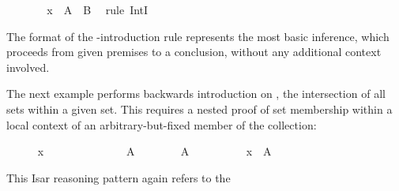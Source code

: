 \begin{isabellebody}
\ \ \ \ \isamarkupfalse%
\ \isamarkupfalse%
\ {\isachardoublequoteopen}x\ {\isasymin}\ A\ {\isasyminter}\ B{\isachardoublequoteclose}\ \isamarkupfalse%
\ {\isacharparenleft}rule\ IntI{\isacharparenright}%
\endisatagproof
{\isafoldproof}%
%
\isadelimproof
%
\endisadelimproof
%
\begin{isamarkuptext}%
\noindent The format of the \isa{{\isachardoublequote}{\isasyminter}{\isachardoublequote}}-introduction rule represents
  the most basic inference, which proceeds from given premises to a
  conclusion, without any additional context involved.

  \medskip The next example performs backwards introduction on \isa{{\isachardoublequote}{\isasymInter}{\isasymA}{\isachardoublequote}}, the intersection of all sets within a given set.  This
  requires a nested proof of set membership within a local context of
  an arbitrary-but-fixed member of the collection:%
\end{isamarkuptext}%
\isamarkuptrue%
%
\medskip\begin{minipage}{0.6\textwidth}
%
\isadelimproof
%
\endisadelimproof
%
\isatagproof
\ \ \ \ \isamarkupfalse%
\ {\isachardoublequoteopen}x\ {\isasymin}\ {\isasymInter}{\isasymA}{\isachardoublequoteclose}\isanewline
\ \ \ \ \isamarkupfalse%
\isanewline
\ \ \ \ \ \ \isamarkupfalse%
\ A\isanewline
\ \ \ \ \ \ \isamarkupfalse%
\ {\isachardoublequoteopen}A\ {\isasymin}\ {\isasymA}{\isachardoublequoteclose}\isanewline
\ \ \ \ \ \ \isamarkupfalse%
\ {\isachardoublequoteopen}x\ {\isasymin}\ A{\isachardoublequoteclose}\ \isamarkupfalse%
\isanewline
\ \ \ \ \isamarkupfalse%
%
\endisatagproof
{\isafoldproof}%
%
\isadelimproof
%
\endisadelimproof
%
\end{minipage}\begin{minipage}{0.4\textwidth}
%
\begin{isamarkuptext}%
%
\end{isamarkuptext}%
\isamarkuptrue%
%
\end{minipage}
%
\begin{isamarkuptext}%
\medskip\noindent This Isar reasoning pattern again refers to the

\end{isamarkuptext}
\end{isabellebody}
